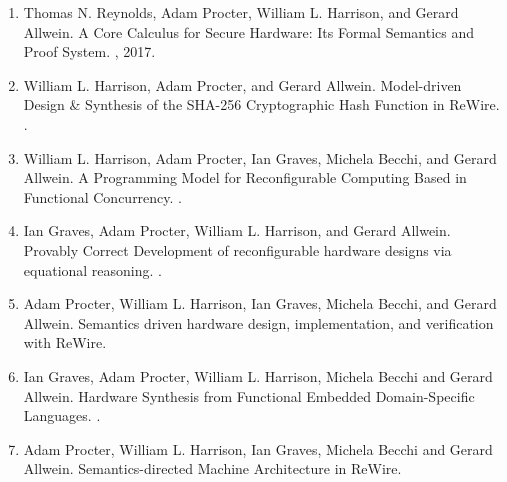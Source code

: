 \documentclass[11pt]{article}
\begin{document}
\begin{enumerate}[leftmargin=0.0mm,resume]
\item 
Thomas N. Reynolds, Adam Procter, William L. Harrison, and Gerard Allwein.
\newblock A Core Calculus for Secure Hardware: Its Formal Semantics and Proof System.
, 2017.


\item
William L. Harrison, Adam Procter, and Gerard Allwein.
\newblock Model-driven Design \& Synthesis of the SHA-256 Cryptographic Hash Function in ReWire.
.

\item
William L. Harrison, Adam Procter, Ian Graves, Michela Becchi, and Gerard Allwein. 
\newblock A Programming Model for Reconfigurable Computing Based in Functional Concurrency.
.

\item
Ian Graves, Adam Procter, William L. Harrison, and Gerard Allwein.
\newblock Provably Correct Development of reconfigurable hardware designs via equational reasoning.
.

\item
Adam Procter, William L. Harrison, Ian Graves, Michela Becchi, and Gerard Allwein. 
\newblock Semantics driven hardware design, implementation, and verification with ReWire. 

\item
Ian Graves, Adam Procter, William L. Harrison, Michela Becchi and Gerard Allwein.
\newblock Hardware Synthesis from Functional Embedded Domain-Specific Languages.
.


\item
Adam Procter, William L. Harrison, Ian Graves, Michela Becchi and Gerard Allwein.
\newblock Semantics-directed Machine Architecture in ReWire.


\end{enumerate}
\end{document}
